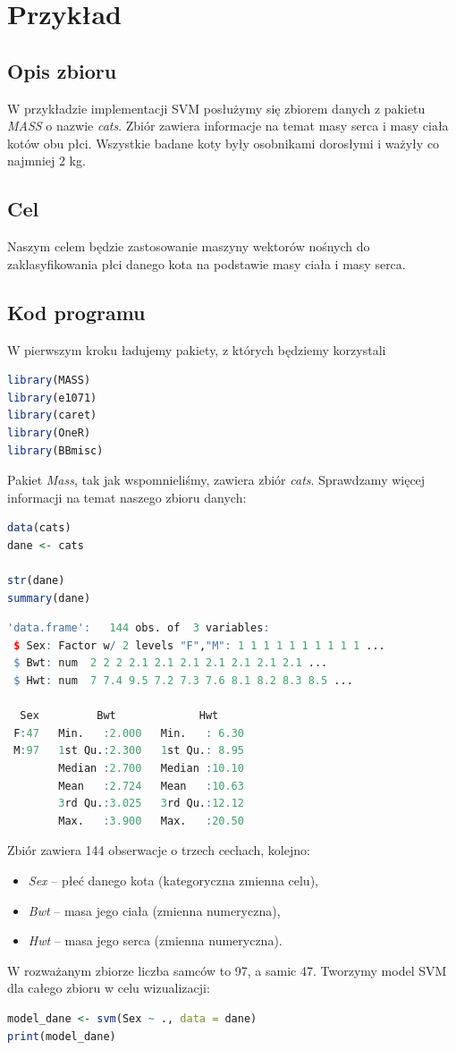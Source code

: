\documentclass[a4paper]{article}
\begin{document}
\section{Przykład}
\subsection{Opis zbioru}
W przykładzie implementacji SVM posłużymy się zbiorem danych z pakietu \textit{MASS} o nazwie \textit{cats}. Zbiór zawiera informacje na temat masy serca i masy ciała kotów obu płci. Wszystkie badane koty były osobnikami dorosłymi i ważyły co najmniej 2 kg. 
\subsection{Cel}
Naszym celem będzie zastosowanie maszyny wektorów nośnych do zaklasyfikowania płci danego kota na podstawie masy ciała i masy serca.
\subsection{Kod programu}
W pierwszym kroku ładujemy pakiety, z których będziemy korzystali
\begin{lstlisting}[language=R, frame=single]
library(MASS)
library(e1071)
library(caret)
library(OneR)
library(BBmisc)
\end{lstlisting}
Pakiet \textit{Mass}, tak jak wspomnieliśmy, zawiera zbiór \textit{cats}. Sprawdzamy więcej informacji na temat naszego zbioru danych:
\begin{lstlisting}[language=R, frame=single]
data(cats)
dane <- cats

str(dane)
summary(dane)
\end{lstlisting}
\begin{lstlisting}[language=R, frame=single]
'data.frame':	144 obs. of  3 variables:
 $ Sex: Factor w/ 2 levels "F","M": 1 1 1 1 1 1 1 1 1 1 ...
 $ Bwt: num  2 2 2 2.1 2.1 2.1 2.1 2.1 2.1 2.1 ...
 $ Hwt: num  7 7.4 9.5 7.2 7.3 7.6 8.1 8.2 8.3 8.5 ...
 
  Sex         Bwt             Hwt       
 F:47   Min.   :2.000   Min.   : 6.30  
 M:97   1st Qu.:2.300   1st Qu.: 8.95  
        Median :2.700   Median :10.10  
        Mean   :2.724   Mean   :10.63  
        3rd Qu.:3.025   3rd Qu.:12.12  
        Max.   :3.900   Max.   :20.50
\end{lstlisting}
Zbiór zawiera 144 obserwacje o trzech cechach, kolejno:
\begin{itemize}
    \item \textit{Sex} -- płeć danego kota (kategoryczna zmienna celu),
    \item \textit{Bwt} -- masa jego ciała (zmienna numeryczna),
    \item \textit{Hwt} -- masa jego serca (zmienna numeryczna). 
\end{itemize} W rozważanym zbiorze liczba samców to 97, a samic 47. Tworzymy model SVM dla całego zbioru w celu wizualizacji:
\begin{lstlisting}[language=R, frame=single]
model_dane <- svm(Sex ~ ., data = dane)
print(model_dane)
\end{lstlisting}
\end{document}
